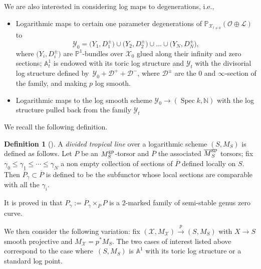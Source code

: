 \documentclass[11pt]{article}
\numberwithin{equation}{section}
\renewcommand{\L}{\mathcal{L}}
\newcommand{\X}{\mathcal{X}}
\renewcommand{\O}{\mathcal{O}}
\newcommand{\Y}{\mathcal{Y}}
\renewcommand{\leq}{\leqslant}
\renewcommand{\bar}{\overline}
\numberwithin{equation}{section}
\theoremstyle{definition}
\newtheorem{defi}[theo]{Definition}
\begin{document}
We are also interested in considering log maps to degenerations, i.e.,
\begin{itemize}\itemsep=0pt
\item Logarithmic maps to \smash{$\Y_t\xrightarrow{p}\mathbb A^1_t$} certain one parameter degenerations of $\mathbb P_{\X_{t\neq 0}}(\O\oplus\L)$ to
\[\Y_0=\bigl(Y_1,D_1^\pm\bigr)\cup\bigl(Y_2,D_2^\pm\bigr)\cup\dots\cup \bigl(Y_N,D_N^\pm\bigr),
\]
where $\bigl(Y_i,D^{\pm}_i\bigr)$ are $\mathbb P^1$-bundles over $\X_0$ glued along their infinity and zero sections;
$\mathbb A^1_t$ is endowed with its toric log structure and $\Y_t$ with the divisorial log structure defined by~${\Y_0+\mathcal{D}^+ +\mathcal{D}^-}$, where $\mathcal{D}^\pm$ are the $0$ and $\infty$-section of the family, and making $p$ log smooth.
\item Logarithmic maps to the log smooth scheme $\Y_0\to(\operatorname{Spec} k,\mathbb N)$ with the log structure pulled back from the family $\Y_t$
\end{itemize}

We recall the following definition.

\begin{defi}[{\cite[Definition~5.2.1]{marcuswiselog}}]
 A \emph{divided tropical line} over a logarithmic scheme $(S,M_S)$ is defined as follows. Let $P$ be an $M_S^{\rm gp}$-torsor and $\bar{P}$ the associated $\bar{M}_S^{\rm gp}$ torsors; fix $\gamma_0\leq\gamma_1\leq\cdots\leq\gamma_N$ a non empty collection of sections of $\bar{P}$ defined locally on $S$. Then $\bar{P}_{\gamma}\subset\bar{P}$ is defined to be the subfunctor whose local sections are comparable with all the $\gamma_i$.
\end{defi}
It is proved in \cite[Proposition~5.2.4]{marcuswiselog} that $P_{\gamma}:=\bar{P}_{\gamma}\times_{\bar{P}} P$ is a 2-marked family of semi-stable genus zero curve.



We then consider the following variation: fix $(\mathcal X, M_{\X})\xrightarrow{p} (S,M_S)$ with $X\to S$ smooth projective and $M_{\X}=p^*M_S$.
The two cases of interest listed above correspond to the case where~$(S,M_S)$ is $\mathbb A^1$ with its toric log structure or a standard log point.
\end{document}

